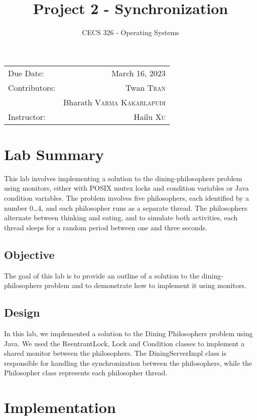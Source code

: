 \documentclass{article}
\title{Project 2 - Synchronization}
\date{CECS 326 - Operating Systems}
\begin{document}
\maketitle

\begin{center}
	\begin{tabular}{l r}
		Due Date: & March 16, 2023 \\ %
		Contributors: & Twan \textsc{Tran} \\ %
		&  Bharath \textsc{Varma Kakarlapudi} \\
		Instructor: & Hailu \textsc{Xu} %
	\end{tabular}
\end{center}

\section{Lab Summary}

This lab involves implementing a solution to the dining-philosophers problem using monitors, either with POSIX mutex locks and condition variables or Java condition variables. The problem involves five philosophers, each identified by a number 0\dots 4, and each philosopher runs as a separate thread. The philosophers alternate between thinking and eating, and to simulate both activities, each thread sleeps for a random period between one and three seconds.

\subsection{Objective}
The goal of this lab is to provide an outline of a solution to the dining-philosophers problem and to demonstrate how to implement it using monitors.

\subsection{Design}
In this lab, we implemented a solution to the Dining Philosophers problem using Java. We used the ReentrantLock, Lock and Condition classes to implement a shared monitor between the philosophers. The DiningServerImpl class is responsible for handling the synchronization between the philosophers, while the Philosopher class represents each philosopher thread.

\section{Implementation}
\end{document}
